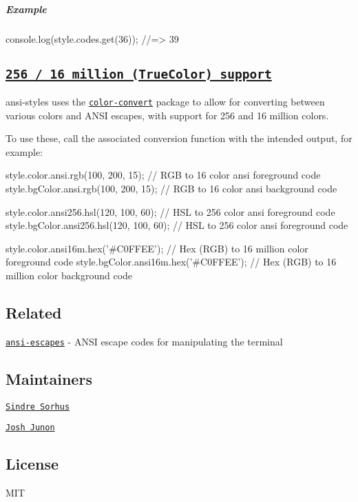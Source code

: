\subparagraph*{Example}


\begin{DoxyCode}
console.log(style.codes.get(36));
//=> 39
\end{DoxyCode}


\subsection*{\href{https://gist.github.com/XVilka/8346728}{\tt 256 / 16 million (True\+Color) support}}

{\ttfamily ansi-\/styles} uses the \href{https://github.com/Qix-/color-convert}{\tt {\ttfamily color-\/convert}} package to allow for converting between various colors and A\+N\+SI escapes, with support for 256 and 16 million colors.

To use these, call the associated conversion function with the intended output, for example\+:


\begin{DoxyCode}
style.color.ansi.rgb(100, 200, 15); // RGB to 16 color ansi foreground code
style.bgColor.ansi.rgb(100, 200, 15); // RGB to 16 color ansi background code

style.color.ansi256.hsl(120, 100, 60); // HSL to 256 color ansi foreground code
style.bgColor.ansi256.hsl(120, 100, 60); // HSL to 256 color ansi foreground code

style.color.ansi16m.hex('#C0FFEE'); // Hex (RGB) to 16 million color foreground code
style.bgColor.ansi16m.hex('#C0FFEE'); // Hex (RGB) to 16 million color background code
\end{DoxyCode}


\subsection*{Related}


\begin{DoxyItemize}
\item \href{https://github.com/sindresorhus/ansi-escapes}{\tt ansi-\/escapes} -\/ A\+N\+SI escape codes for manipulating the terminal
\end{DoxyItemize}

\subsection*{Maintainers}


\begin{DoxyItemize}
\item \href{https://github.com/sindresorhus}{\tt Sindre Sorhus}
\item \href{https://github.com/qix-}{\tt Josh Junon}
\end{DoxyItemize}

\subsection*{License}

M\+IT 